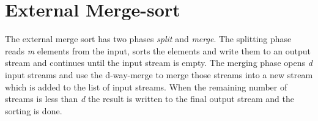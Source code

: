 \section{External Merge-sort}
The external merge sort has two phases \textit{split} and \textit{merge}. The splitting phase reads \textit{m} elements from the input, sorts the elements and write them to an output stream and continues until the input stream is empty. The merging phase opens \textit{d} input streams and use the d-way-merge to merge those streams into a new stream which is added to the list of input streams. When the remaining number of streams is less than \textit{d} the result is written to the final output stream and the sorting is done.


